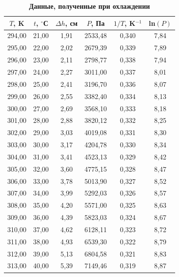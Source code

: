 \documentclass[11pt]{article}
\begin{document}
\begin{table}[H]
\centering
\caption{\textbf{Данные, полученные при охлаждении}}
\begin{tabular}{|c|c|c|c|c|c|}
\hline
$T$, K & $t$, $^{\circ}$С & $\Delta h$, см & $P$, Па & $1/T$, K$^{-1}$ & ln$(P)$ \\ \hline
294,00 & 21,00            & 1,91           & 2533,48 & 0,340           & 7,84    \\ \hline
295,00 & 22,00            & 2,02           & 2679,39 & 0,339           & 7,89    \\ \hline
296,00 & 23,00            & 2,11           & 2798,77 & 0,338           & 7,94    \\ \hline
297,00 & 24,00            & 2,27           & 3011,00 & 0,337           & 8,01    \\ \hline
298,00 & 25,00            & 2,41           & 3196,70 & 0,336           & 8,07    \\ \hline
299,00 & 26,00            & 2,55           & 3382,40 & 0,334           & 8,13    \\ \hline
300,00 & 27,00            & 2,69           & 3568,10 & 0,333           & 8,18    \\ \hline
301,00 & 28,00            & 2,88           & 3820,12 & 0,332           & 8,25    \\ \hline
302,00 & 29,00            & 3,03           & 4019,08 & 0,331           & 8,30    \\ \hline
303,00 & 30,00            & 3,17           & 4204,78 & 0,330           & 8,34    \\ \hline
304,00 & 31,00            & 3,41           & 4523,13 & 0,329           & 8,42    \\ \hline
305,00 & 32,00            & 3,60           & 4775,15 & 0,328           & 8,47    \\ \hline
306,00 & 33,00            & 3,78           & 5013,90 & 0,327           & 8,52    \\ \hline
307,00 & 34,00            & 3,99           & 5292,03 & 0,326           & 8,57    \\ \hline
308,00 & 35,00            & 4,20           & 5571,00 & 0,325           & 8,63    \\ \hline
309,00 & 36,00            & 4,39           & 5823,03 & 0,324           & 8,67    \\ \hline
310,00 & 37,00            & 4,62           & 6128,11 & 0,323           & 8,72    \\ \hline
311,00 & 38,00            & 4,93           & 6539,30 & 0,322           & 8,79    \\ \hline
312,00 & 39,00            & 5,13           & 6804,58 & 0,321           & 8,83    \\ \hline
313,00 & 40,00            & 5,39           & 7149,46 & 0,319           & 8,87    \\ \hline
\end{tabular}
\end{table}
\end{document}
